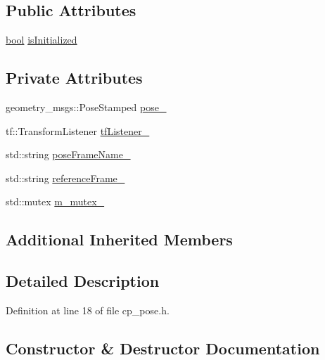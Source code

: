 \subsection*{Public Attributes}
\begin{DoxyCompactItemize}
\item 
\hyperlink{classbool}{bool} \hyperlink{classcl__move__base__z_1_1Pose_a49df3a978021edb71a48ef5e6d8e75a8}{is\+Initialized}
\end{DoxyCompactItemize}
\subsection*{Private Attributes}
\begin{DoxyCompactItemize}
\item 
geometry\+\_\+msgs\+::\+Pose\+Stamped \hyperlink{classcl__move__base__z_1_1Pose_a9da7acf880968a3c220b8436fd0bb6ef}{pose\+\_\+}
\item 
tf\+::\+Transform\+Listener \hyperlink{classcl__move__base__z_1_1Pose_a6d669632db37e0e51734d2a65e8dcd41}{tf\+Listener\+\_\+}
\item 
std\+::string \hyperlink{classcl__move__base__z_1_1Pose_a4f45be8e2fd73e618d815582a4ca8efe}{pose\+Frame\+Name\+\_\+}
\item 
std\+::string \hyperlink{classcl__move__base__z_1_1Pose_a6a7a593232b6edaf99103d48ad8da9d3}{reference\+Frame\+\_\+}
\item 
std\+::mutex \hyperlink{classcl__move__base__z_1_1Pose_a73ed2daba3e473e156cab751fb37b58f}{m\+\_\+mutex\+\_\+}
\end{DoxyCompactItemize}
\subsection*{Additional Inherited Members}


\subsection{Detailed Description}


Definition at line 18 of file cp\+\_\+pose.\+h.



\subsection{Constructor \& Destructor Documentation}
\mbox{\label{classcl__move__base__z_1_1Pose_aa361cd1347cfead0f244045fe183c600}} 
